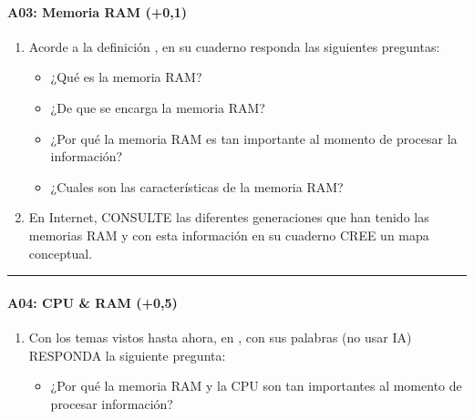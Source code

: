 \documentclass[letterpaper,10pt,spanish]{sphinxmanual}
\begin{document}
\paragraph{A03: Memoria RAM (+0,1)}
\label{\detokenize{cursos/logica8/periodo01/G01:a03-memoria-ram-0-1}}
\sphinxAtStartPar
{}
\begin{enumerate}
%
\item {} 
\sphinxAtStartPar
Acorde a la definición , en su cuaderno responda las siguientes preguntas:
\begin{itemize}
\item {} 
\sphinxAtStartPar
¿Qué es la memoria RAM?

\item {} 
\sphinxAtStartPar
¿De que se encarga la memoria RAM?

\item {} 
\sphinxAtStartPar
¿Por qué la memoria RAM es tan importante al momento de procesar la información?

\item {} 
\sphinxAtStartPar
¿Cuales son las características de la memoria RAM?

\end{itemize}

\item {} 
\sphinxAtStartPar
En Internet, CONSULTE las diferentes generaciones que han tenido las memorias RAM y con esta información en su cuaderno CREE un mapa conceptual.

\end{enumerate}


\bigskip\hrule\bigskip



\paragraph{A04: CPU \& RAM (+0,5)}
\label{\detokenize{cursos/logica8/periodo01/G01:a04-cpu-ram-0-5}}
\sphinxAtStartPar
{}
\begin{enumerate}
%
\item {} 
\sphinxAtStartPar
Con los temas vistos hasta ahora, en , con sus palabras (no usar IA) RESPONDA la siguiente pregunta:
\begin{itemize}
\item {} 
\sphinxAtStartPar
¿Por qué la memoria RAM y la CPU son tan importantes al momento de procesar información?

\end{itemize}

\end{enumerate}
\end{document}
